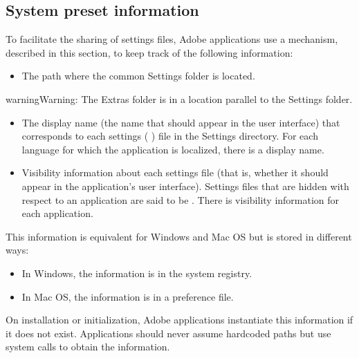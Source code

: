 \documentclass[letterpaper,12pt,english,openany,oneside]{sphinxmanual}
\begin{document}
\subsection{System preset information}
\label{\detokenize{index:system-preset-information}}
To facilitate the sharing of settings files, Adobe applications use a mechanism, described in this section, to keep track of the following information:
\begin{itemize}
\item {} 
The path where the common Settings folder is located.

\end{itemize}

\begin{sphinxadmonition}{warning}{Warning:}
The Extras folder is in a location parallel to the Settings folder.
\end{sphinxadmonition}
\begin{itemize}
\item {} 
The display name (the name that should appear in the user interface) that corresponds to each settings ( ) file in the Settings directory. For each language for which the application is localized, there is a display name.

\item {} 
Visibility information about each settings file (that is, whether it should appear in the application’s user interface). Settings files that are hidden with respect to an application are said to be  . There is visibility information for each application.

\end{itemize}

This information is equivalent for Windows and Mac OS but is stored in different ways:
\begin{itemize}
\item {} 
In Windows, the information is in the system registry.

\item {} 
In Mac OS, the information is in a preference file.

\end{itemize}

On installation or initialization, Adobe applications instantiate this information if it does not exist. Applications should never assume hard\sphinxhyphen{}coded paths but use system calls to obtain the information.
\end{document}
